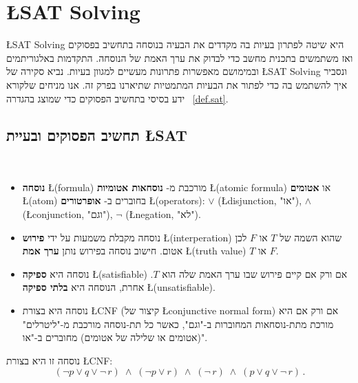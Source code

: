 
\section{\L{SAT Solving}}\label{s.sat}

\L{SAT Solving}
היא שיטה לפתרון בעיות בה מקדדים את הבעיה בנוסחה בתחשיב בפסוקים ואז משתמשים בתכנית מחשב כדי לבדוק את ערך האמת של הנוסחה. התקדמות באלגוריתמים ובמימושם מאפשרות פתרונות מעשיים למגוון בעיות. נביא סקירה של 
\L{SAT Solving}
ונסביר איך להשתמש בה כדי לפתור את הבעיות המתמטיות שתיארנו בפרק זה. אנו מניחים שלקורא ידע בסיסי בתחשיב הפסוקים כדי שמוצג בהגדרה%
~\ref{def.sat}.

\subsection{תחשיב הפסוקים ובעיית \L{SAT}}

\begin{definition}\label{def.sat}
\mbox{}\\
\vspace{-4ex}
\begin{itemize}
\item
\textbf{נוסחה}
\L{(formula)}
מורכבת מ-%
\textbf{נוסחאות אטומיות}
\L{(atomic formula)}
או
\textbf{אטומים}
\L{(atom)}
בחוברים ב-%
\textbf{אופרטורים}
\L{(operators)}:
$\vee$ (\L{disjunction}, "או"),
$\wedge$ (\L{conjunction}, "וגם"),
$\neg$ (\L{negation}, "לא").

\item
נוסחה מקבלת משמעות על ידי 
\textbf{פירוש}
\L{(interperation)}
שהוא השמה של
$T$
או
$F$
לכן אטום. חישוב נוסחה בפירוש נותן 
\textbf{ערך אמת}
\L{(truth value)}
$T$
או
$F$. 

\item
נוסחה היא
\textbf{ספיקה}
\L{(satisfiable)}
אם ורק אם קיים פירוש שבו ערך האמת שלה הוא
$T$.
אחרת, הנוסחה היא
\textbf{בלתי ספיקה}
\L{(unsatisfiable)}.

\item
נוסחה היא בצורת
\L{CNF}
(קיצור של
\L{conjunctive normal form})
אם ורק אם היא מורכת מתת-נוסחאות המחוברות ב-"וגם", כאשר כל תת-נוסחה מורכבת מ-"ליטרלים" (אטומים או שלילה של אטומים) מחוברים ב-"או".
\end{itemize}
\end{definition}

נוסחה זו היא בצורת
\L{CNF}:
\[
(\neg p \vee q \vee \neg \,r) \;\wedge\; (\neg p \vee r)
\;\wedge\; (\neg \,r)\;\wedge\;(p \vee q \vee \neg \,r)\,.
\]

